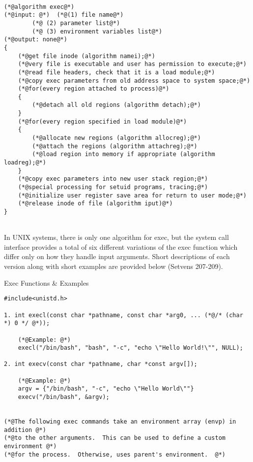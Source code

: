 \documentclass[12pt]{extarticle}
\newenvironment{myindentpar}[1]%
 {\begin{list}{}%
         {\setlength{\leftmargin}{#1}}%
         \item[]%
 }
 {\end{list}}
\begin{document}
\begin{myindentpar}{5mm}
\ \\
\begin{lstlisting}[frame=single]
(*@algorithm exec@*)
(*@input: @*)  (*@(1) file name@*)
        (*@ (2) parameter list@*)
        (*@ (3) environment variables list@*)
(*@output: none@*)
{
    (*@get file inode (algorithm namei);@*)
    (*@very file is executable and user has permission to execute;@*)
    (*@read file headers, check that it is a load module;@*)
    (*@copy exec parameters from old address space to system space;@*)
    (*@for(every region attached to process)@*)
    {
        (*@detach all old regions (algorithm detach);@*)
    }
    (*@for(every region specified in load module)@*)
    {
        (*@allocate new regions (algorithm allocreg);@*)
        (*@attach the regions (algorithm attachreg);@*)
        (*@load region into memory if appropriate (algorithm loadreg);@*)
    }
    (*@copy exec parameters into new user stack region;@*)
    (*@special processing for setuid programs, tracing;@*)
    (*@initialize user register save area for return to user mode;@*)
    (*@release inode of file (algorithm iput)@*)
}
\end{lstlisting}

    \ \\
    In UNIX systems, there is only one algorithm for exec, but the system call interface provides a total of six different variations of the exec function which differ only on how they handle input arguments.  Short descriptions of each version along with short examples are provided below (Setvens 207-209).  

    \begin{center}
        Exec Functions \& Examples
    \end{center}
\begin{lstlisting}[frame=single]
#include<unistd.h>

1. int execl(const char *pathname, const char *arg0, ... (*@/* (char *) 0 */ @*));

    (*@Example: @*)
    execl("/bin/bash", "bash", "-c", "echo \"Hello World!\"", NULL);

2. int execv(const char *pathname, char *const argv[]);

    (*@Example: @*)
    argv = {"/bin/bash", "-c", "echo \"Hello World\""}
    execv("/bin/bash", &argv);


(*@The following exec commands take an environment array (envp) in addition @*)
(*@to the other arguments.  This can be used to define a custom environment @*)
(*@for the process.  Otherwise, uses parent's environment.  @*)


\end{lstlisting}
\end{myindentpar}
\end{document}
